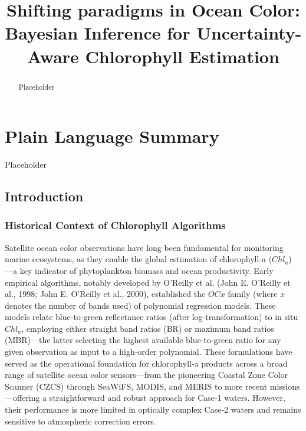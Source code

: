\documentclass[
]{agujournal2019}
\begin{document}
\title{Shifting paradigms in Ocean Color: Bayesian Inference for
Uncertainty-Aware Chlorophyll Estimation}



\begin{abstract}
Placeholder
\end{abstract}

\section*{Plain Language Summary}
Placeholder




\subsection{Introduction}\label{introduction}

\subsubsection{Historical Context of Chlorophyll
Algorithms}\label{historical-context-of-chlorophyll-algorithms}

Satellite ocean color observations have long been fundamental for
monitoring marine ecosystems, as they enable the global estimation of
chlorophyll‑a (\(Chl_a\)) ---a key indicator of phytoplankton biomass
and ocean productivity. Early empirical algorithms, notably developed by
O'Reilly et al. (John E. O'Reilly et al., 1998; John E. O'Reilly et al.,
2000), established the \(OCx\) family (where \(x\) denotes the number of
bands used) of polynomial regression models. These models relate
blue-to-green reflectance ratios (after log‑transformation) to in situ
\(Chl_a\), employing either straight band ratios (BR) or maximum band
ratios (MBR)---the latter selecting the highest available blue-to-green
ratio for any given observation as input to a high‑order polynomial.
These formulations have served as the operational foundation for
chlorophyll‑a products across a broad range of satellite ocean color
sensors---from the pioneering Coastal Zone Color Scanner (CZCS) through
SeaWiFS, MODIS, and MERIS to more recent missions---offering a
straightforward and robust approach for Case‑1 waters. However, their
performance is more limited in optically complex Case‑2 waters and
remains sensitive to atmospheric correction errors.
\end{document}
